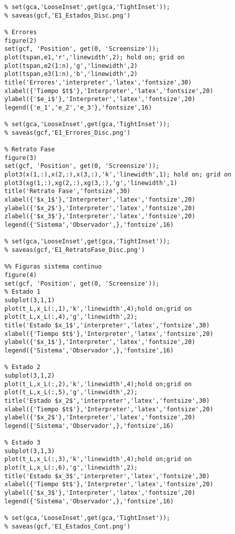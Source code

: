 \begin{verbatim}
	% set(gca,'LooseInset',get(gca,'TightInset'));
	% saveas(gcf,'E1_Estados_Disc.png')
	
	% Errores
	figure(2)
	set(gcf, 'Position', get(0, 'Screensize'));
	plot(tspan,e1,'r','linewidth',2); hold on; grid on
	plot(tspan,e2(1:n),'g','linewidth',2)
	plot(tspan,e3(1:n),'b','linewidth',2)
	title('Errores','interpreter','latex','fontsize',30)
	xlabel({'Tiempo $t$'},'Interpreter','latex','fontsize',20)
	ylabel({'$e_i$'},'Interpreter','latex','fontsize',20)
	legend({'e_1','e_2','e_3'},'fontsize',16)
	
	% set(gca,'LooseInset',get(gca,'TightInset'));
	% saveas(gcf,'E1_Errores_Disc.png')
	
	% Retrato Fase
	figure(3)
	set(gcf, 'Position', get(0, 'Screensize'));
	plot3(x(1,:),x(2,:),x(3,:),'k','linewidth',1); hold on; grid on
	plot3(xg(1,:),xg(2,:),xg(3,:),'g','linewidth',1)
	title('Retrato Fase','fontsize',30)
	xlabel({'$x_1$'},'Interpreter','latex','fontsize',20)
	ylabel({'$x_2$'},'Interpreter','latex','fontsize',20)
	zlabel({'$x_3$'},'Interpreter','latex','fontsize',20)
	legend({'Sistema','Observador',},'fontsize',16)
	
	% set(gca,'LooseInset',get(gca,'TightInset'));
	% saveas(gcf,'E1_RetratoFase_Disc.png')
	
	%% Figuras sistema continuo
	figure(4)
	set(gcf, 'Position', get(0, 'Screensize'));
	% Estado 1
	subplot(3,1,1)
	plot(t_L,x_L(:,1),'k','linewidth',4);hold on;grid on
	plot(t_L,x_L(:,4),'g','linewidth',2);
	title('Estado $x_1$','interpreter','latex','fontsize',30)
	xlabel({'Tiempo $t$'},'Interpreter','latex','fontsize',20)
	ylabel({'$x_1$'},'Interpreter','latex','fontsize',20)
	legend({'Sistema','Observador',},'fontsize',16)
	
	% Estado 2
	subplot(3,1,2)
	plot(t_L,x_L(:,2),'k','linewidth',4);hold on;grid on
	plot(t_L,x_L(:,5),'g','linewidth',2);
	title('Estado $x_2$','interpreter','latex','fontsize',30)
	xlabel({'Tiempo $t$'},'Interpreter','latex','fontsize',20)
	ylabel({'$x_2$'},'Interpreter','latex','fontsize',20)
	legend({'Sistema','Observador',},'fontsize',16)
	
	% Estado 3
	subplot(3,1,3)
	plot(t_L,x_L(:,3),'k','linewidth',4);hold on;grid on
	plot(t_L,x_L(:,6),'g','linewidth',2);
	title('Estado $x_3$','interpreter','latex','fontsize',30)
	xlabel({'Tiempo $t$'},'Interpreter','latex','fontsize',20)
	ylabel({'$x_3$'},'Interpreter','latex','fontsize',20)
	legend({'Sistema','Observador',},'fontsize',16)
	
	% set(gca,'LooseInset',get(gca,'TightInset'));
	% saveas(gcf,'E1_Estados_Cont.png')
	

\end{verbatim}
